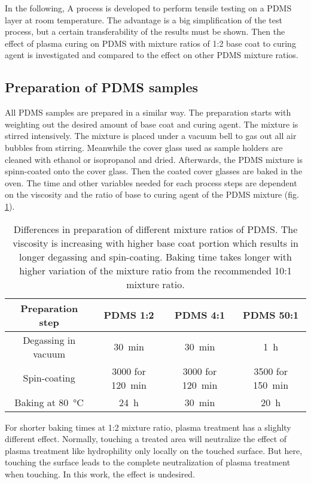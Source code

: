 In the following, A process is developed to perform tensile testing on a PDMS layer at room temperature. The advantage is a big simplification of the test process, but a certain transferability of the results must be shown. Then the effect of plasma curing on PDMS with mixture ratios of 1:2 base coat to curing agent is investigated and compared to the effect on other PDMS mixture ratios.

\subsection{Preparation of PDMS samples}

All PDMS samples are prepared in a similar way. The preparation starts with weighting out the desired amount of base coat and curing agent. The mixture is stirred intensively. The mixture is placed under a vacuum bell to gas out all air bubbles from stirring. Meanwhile the cover glass used as sample holders are cleaned with ethanol or isopropanol and dried. Afterwards, the PDMS mixture is spinn-coated onto the cover glass. Then the coated cover glasses are baked in the oven. The time and other variables needed for each process steps are dependent on the viscosity and the ratio of base to curing agent of the PDMS mixture (fig. \ref{table:preparationPDMSmixturereatios}). 

\begin{table}
	\centering
	\begin{tabular}{|c|c|c|c|}
		\hline
		 Preparation step & PDMS 1:2 & PDMS 4:1 & PDMS 50:1 \\
		\hline
		\hline
		Degassing in vacuum & \SI{30}{\minute} & \SI{30}{\minute} & \SI{1}{\hour}\\
		\hline
		Spin-coating & \SI{3000}{\rpm} for \SI{120}{\minute}  & \SI{3000}{\rpm} for \SI{120}{\minute} & \SI{3500}{\rpm} for \SI{150}{\minute} \\
		\hline
		Baking at \SI{80}{\degreeCelsius} & \SI{24}{\hour} & \SI{30}{\minute} & \SI{20}{\hour}\\
		\hline	
	\end{tabular}
	\caption{Differences in preparation of different mixture ratios of PDMS. The viscosity is increasing with higher base coat portion which results in longer degassing and spin-coating. Baking time takes longer with higher variation of the mixture ratio from the recommended 10:1 mixture ratio.}
	\label{table:preparationPDMSmixturereatios}
\end{table}

For shorter baking times at 1:2 mixture ratio, plasma treatment has a slighlty different effect. Normally, touching a treated area will neutralize the effect of plasma treatment like hydrophility only locally on the touched surface. But here, touching the surface leads to the complete neutralization of plasma treatment when touching. In this work, the effect is undesired.

